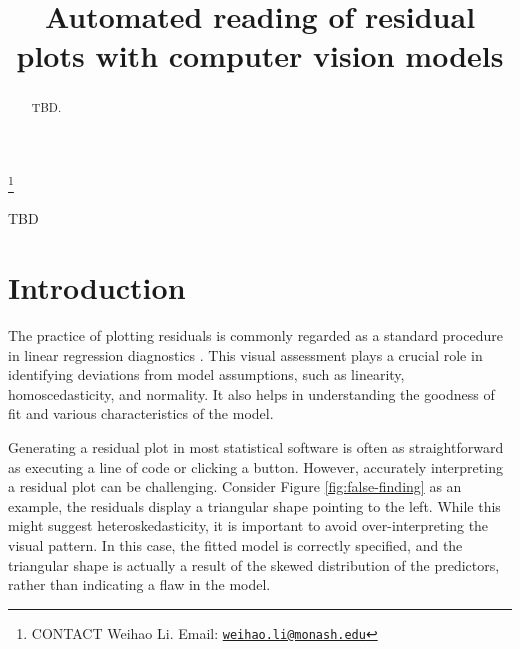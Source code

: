 \documentclass[]{interact}
\theoremstyle{plain}%
\theoremstyle{definition}
\theoremstyle{remark}
\begin{document}

\title{Automated reading of residual plots with computer vision models}


\author{
}

\thanks{CONTACT Weihao
Li. Email: \href{mailto:weihao.li@monash.edu}{\nolinkurl{weihao.li@monash.edu}}}

\maketitle

\begin{abstract}
TBD.
\end{abstract}

\begin{keywords}
TBD
\end{keywords}

\newpage
\tableofcontents
\newpage

\hypertarget{introduction}{%
\section{Introduction}\label{introduction}}

The practice of plotting residuals is commonly regarded as a standard
procedure in linear regression diagnostics
\citep[see][]{cook1982residuals, belsley1980regression}. This visual
assessment plays a crucial role in identifying deviations from model
assumptions, such as linearity, homoscedasticity, and normality. It also
helps in understanding the goodness of fit and various characteristics
of the model.

Generating a residual plot in most statistical software is often as
straightforward as executing a line of code or clicking a button.
However, accurately interpreting a residual plot can be challenging.
Consider Figure \ref{fig:false-finding} as an example, the residuals
display a triangular shape pointing to the left. While this might
suggest heteroskedasticity, it is important to avoid over-interpreting
the visual pattern. In this case, the fitted model is correctly
specified, and the triangular shape is actually a result of the skewed
distribution of the predictors, rather than indicating a flaw in the
model.
\end{document}

